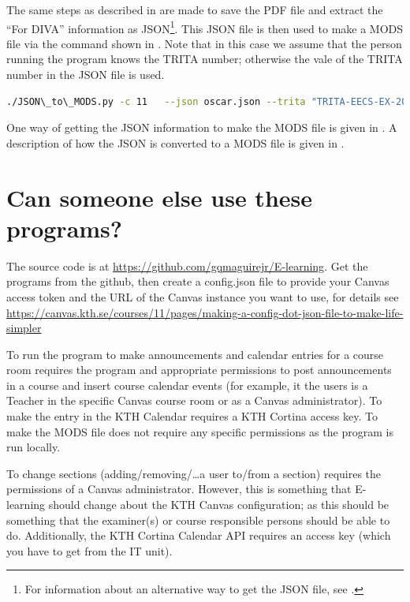 The same steps as described in  are made to save the PDF file and extract the “For DIVA” information as JSON\footnote{For information about an alternative way to get the JSON file, see .}. This JSON file is then used to make a MODS file via the command shown in . Note that in this case we assume that the person running the program knows the TRITA number; otherwise the vale of the TRITA number in the JSON file is used.
\begin{lstlisting}[language={bash}, caption={JSON\_to\_MODS.py for Oscar}, label=lst:jsonToMODSforOscar] 
./JSON\_to\_MODS.py -c 11   --json oscar.json --trita "TRITA-EECS-EX-2021:xxxx"
\end{lstlisting}

One way of getting the JSON information to make the MODS file is given in . A description of how the JSON is converted to a MODS file is given in .

\section{Can someone else use these programs?}
The source code is at \url{https://github.com/gqmaguirejr/E-learning}. Get the programs from the github, then create a config.json file to provide your Canvas access token and the URL of the Canvas instance you want to use, for details see \url{https://canvas.kth.se/courses/11/pages/making-a-config-dot-json-file-to-make-life-simpler} 

To run the program to make announcements and calendar entries for a course room requires the program and appropriate permissions  to post announcements in a course and insert course calendar events (for example, it the users is a Teacher in the specific Canvas course room or as a Canvas administrator). To make the entry in the KTH Calendar requires a KTH Cortina access key. To make the MODS file does not require any specific permissions as the program is run locally.

To change sections (adding/removing/\ldots a user to/from a section) requires the permissions of a Canvas administrator. However, this is something that E-learning should change about the KTH Canvas configuration; as this should be something that the examiner(s) or course responsible persons should be able to do. Additionally, the KTH Cortina Calendar API requires an access key (which you have to get from the IT unit).

